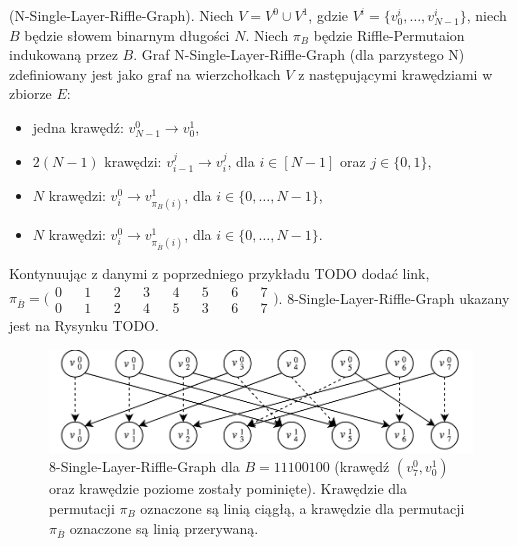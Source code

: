 \begin{definition}
	(N-Single-Layer-Riffle-Graph). Niech $V = V^{0} \cup V^{1}$, gdzie $V^{i} = \{ v_{0}^{i},\dots,v_{N-1}^{i} \}$, niech $B$ będzie słowem binarnym długości $N$. Niech $\pi_{B}$ będzie Riffle-Permutaion indukowaną przez $B$.
	Graf N-Single-Layer-Riffle-Graph (dla parzystego N) zdefiniowany jest jako graf na wierzchołkach $V$ z następującymi krawędziami w zbiorze $E$:
	\begin{itemize}
		\item jedna krawędź: $v_{N-1}^{0} \rightarrow v_{0}^{1}$,
		
		\item $2(N - 1)$ krawędzi: $v_{i-1}^{j} \rightarrow v_{i}^{j}$, dla $i \in [N-1]$ oraz $j \in \{0, 1\}$,
		
		\item $N$ krawędzi: $v_{i}^{0} \rightarrow v_{\pi_{B}(i)}^{1}$, dla $i \in \{0,\dots,N -1\}$,
		
		\item $N$ krawędzi: $v_{i}^{0} \rightarrow v_{\pi_{\overline{B}}(i)}^{1}$, dla $i \in \{0,\dots,N -1\}$.
	\end{itemize}
\end{definition}

\begin{example}
	Kontynuując z danymi z poprzedniego przykładu TODO dodać link,
		$\pi_{\overline{B}} = \bigl( \begin{smallmatrix}
	0 && 1 && 2 && 3 && 4 && 5 && 6 && 7 \\
	0 && 1 && 2 && 4 && 5 && 3 && 6 && 7
	\end{smallmatrix} \bigr) $.
	 8-Single-Layer-Riffle-Graph ukazany jest na Rysynku TODO.
\end{example}

\begin{figure}[h]
	\includegraphics[width=\textwidth]{rp2.png}
	\centering
	\caption{8-Single-Layer-Riffle-Graph dla $B=11100100$ (krawędź $(v_{7}^{0}, v_{0}^{1})$ oraz krawędzie poziome zostały pominięte). Krawędzie dla permutacji $\pi_{B}$ oznaczone są linią ciągłą, a krawędzie dla permutacji $\pi_{\overline{B}}$ oznaczone są linią przerywaną.}
\end{figure}

